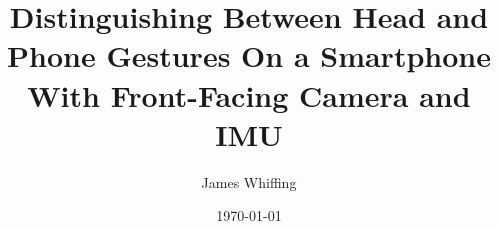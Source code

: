 


%
%

\title{Distinguishing Between Head and Phone Gestures On a Smartphone With Front-Facing Camera and IMU}
\date{\today}
\author{James Whiffing} %
\renewcommand{\shortauthors}{Whiffing, James}

\begin{abstract}
\end{abstract}

\begin{CCSXML}

\end{CCSXML}

